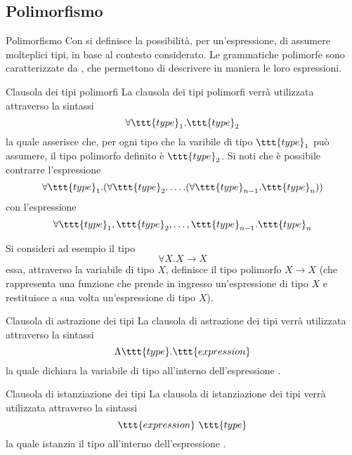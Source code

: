 \documentclass[a4paper, 12pt]{report}
\begin{document}
    \subsection{Polimorfismo}

    \begin{frameddefn}{Polimorfismo}
        Con  si definisce la possibilità, per un'espressione, di assumere molteplici tipi, in base al contesto considerato. Le grammatiche polimorfe sono caratterizzate da , che permettono di descrivere in maniera  le loro espressioni.
    \end{frameddefn}

    \begin{frameddefn}{Clausola dei tipi polimorfi}
        La clausola dei tipi polimorfi verrà utilizzata attraverso la sintassi $$\forall \ttt{type}_1.\ttt{type}_2$$ la quale asserisce che, per ogni tipo che la varibile di tipo $\ttt{type}_1$ può assumere, il tipo polimorfo definito è $\ttt{type}_2$. Si noti che è possibile contrarre l'espressione $$\forall \ttt{type}_1.(\forall \ttt{type}_2 . \ldots .(\forall \ttt{type}_{n - 1}. \ttt{type}_n))$$ con l'espressione $$\forall \ttt{type}_1, \ttt{type}_2, \ldots, \ttt{type}_{n - 1}. \ttt{type}_n$$
    \end{frameddefn}

    \begin{example}
        Si consideri ad esempio il tipo $$\forall X.X \to X$$ essa, attraverso la variabile di tipo $X$, definisce il tipo polimorfo $X \to X$ (che rappresenta una funzione che prende in ingresso un'espressione di tipo $X$ e restituisce a sua volta un'espressione di tipo $X$).
    \end{example}

    \begin{frameddefn}{Clausola di astrazione dei tipi}
        La clausola di astrazione dei tipi verrà utilizzata attraverso la sintassi $$\Lambda \ttt{type}.\ttt{expression}$$ la quale dichiara la variabile di tipo  all'interno dell'espressione .
    \end{frameddefn}

    \begin{frameddefn}{Clausola di istanziazione dei tipi}
       La clausola di istanziazione dei tipi verrà utilizzata attraverso la sintassi $$\ttt{expression} \ \ttt{type}$$ la quale istanzia il tipo  all'interno dell'espressione .
    \end{frameddefn}
\end{document}
